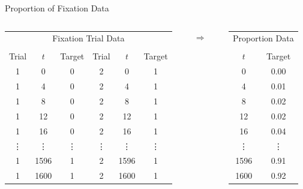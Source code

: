 \documentclass{beamer}
\begin{document}
\begin{frame}{Proportion of Fixation Data}

\begin{columns}
\begin{column}{0.6\textwidth}
\begin{table}[ht]
\centering
\begin{tabular}{ccc|ccc}
\multicolumn{6}{c}{Fixation Trial Data} \\ 
& \\
  \hline
Trial & $t$ & Target & Trial & $t$ & Target \\ 
  \hline
  1 &   0 &   0 &   2 &   0 &   1 \\ 
    1 &   4 &   0 &   2 &   4 &   1 \\ 
    1 &   8 &   0 &   2 &   8 &   1 \\ 
    1 &  12 &   0 &   2 &  12 &   1 \\ 
    1 &  16 &   0 &   2 &  16 &   1 \\ 
    \vdots &  \vdots &   \vdots &   \vdots &  \vdots &   \vdots \\ 
    1 & 1596 &   1 &   2 & 1596 &   1 \\ 
    1 & 1600 &   1 &   2 & 1600 &   1 \\ 
   \hline
\end{tabular}
\end{table}
\end{column}

\begin{column}{0.1\textwidth}  %
\centering
{\huge $\Rightarrow$}
\end{column}

\begin{column}{0.3\textwidth}  %
\vspace{5mm}
\begin{table}[ht]
\centering
\begin{tabular}{cc}
\multicolumn{2}{c}{Proportion Data} \\ 
& \\
  \hline
$t$ & Target \\ 
  \hline
  0 & 0.00 \\ 
    4 & 0.01 \\ 
    8 & 0.02 \\ 
   12 & 0.02 \\ 
   16 & 0.04 \\ 
   \vdots & \vdots \\ 
  1596 & 0.91 \\ 
  1600 & 0.92 \\ 
   \hline
\end{tabular}
\end{table}
\end{column}
\end{columns}



\end{frame}
\end{document}
